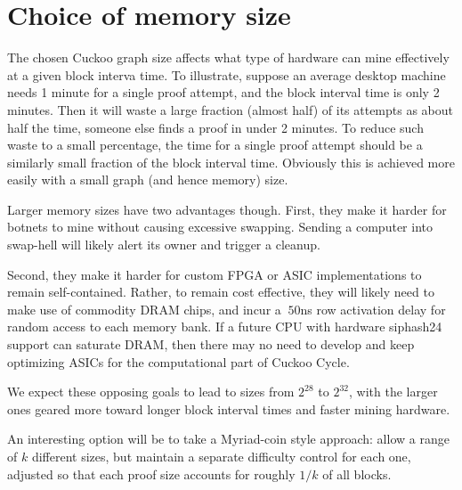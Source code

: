 \documentclass[11pt, oneside]{article}
\begin{document}
\section{Choice of memory size}
The chosen Cuckoo graph size affects what type of hardware can mine effectively at a given block interva time.
To illustrate, suppose an average desktop machine needs 1 minute for a single proof attempt,
and the block interval time is only 2 minutes. Then it will waste a large fraction (almost half)
of its attempts as about half the time, someone else finds a proof in under 2 minutes. To reduce such waste
to a small percentage, the time for a single proof attempt should be a similarly small fraction of the block
interval time. Obviously this is achieved more easily with a small graph (and hence memory) size.

Larger memory sizes have two advantages though. First, they make it harder for botnets to mine without
causing excessive swapping. Sending a computer into swap-hell will likely alert its owner and trigger a cleanup.

Second, they make it harder for custom FPGA or ASIC implementations to remain self-contained.
Rather, to remain cost effective, they will likely need to make use of commodity DRAM chips,
and incur a $~50$ns row activation delay for random access to each memory bank.
If a future CPU with hardware siphash24 support can saturate DRAM, then there may no need
to develop and keep optimizing ASICs for the computational part of Cuckoo Cycle.

We expect these opposing goals to lead to sizes from $2^{28}$ to $2^{32}$, with the larger ones geared
more toward longer block interval times and faster mining hardware.

An interesting option will be to take a Myriad-coin style approach: allow a range of $k$ different sizes,
but maintain a separate difficulty control for each one, adjusted so that each proof size accounts
for roughly $1/k$ of all blocks.

\end{document}
